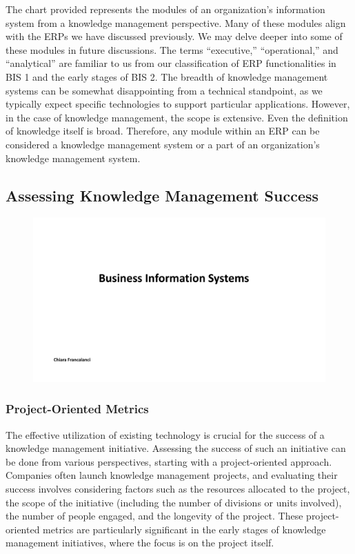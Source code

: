 The chart provided represents the modules of an organization's
information system from a knowledge management perspective. Many of
these modules align with the ERPs we have discussed previously. We may
delve deeper into some of these modules in future discussions. The terms
``executive,'' ``operational,'' and ``analytical'' are familiar to us
from our classification of ERP functionalities in BIS 1 and the early
stages of BIS 2. The breadth of knowledge management systems can be
somewhat disappointing from a technical standpoint, as we typically
expect specific technologies to support particular applications.
However, in the case of knowledge management, the scope is extensive.
Even the definition of knowledge itself is broad. Therefore, any module
within an ERP can be considered a knowledge management system or a part
of an organization's knowledge management system.

\subsection{Assessing Knowledge Management
  Success}\label{assessing-knowledge-management-success}

\begin{figure}[!h]
  \centering
  \includegraphics[page=17, trim = 1.5cm 4cm 3cm 4cm, clip, width=\imagewidth]{images/05 - KM.pdf}
\end{figure}

\subsubsection{Project-Oriented Metrics}\label{project-oriented-metrics}

The effective utilization of existing technology is crucial for the
success of a knowledge management initiative. Assessing the success of
such an initiative can be done from various perspectives, starting with
a project-oriented approach. Companies often launch knowledge management
projects, and evaluating their success involves considering factors such
as the resources allocated to the project, the scope of the initiative
(including the number of divisions or units involved), the number of
people engaged, and the longevity of the project. These project-oriented
metrics are particularly significant in the early stages of knowledge
management initiatives, where the focus is on the project itself.

